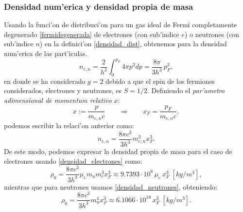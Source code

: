 \subsubsection{Densidad num'erica y densidad propia de masa}
Usando la funci'on de distribuci'on para un gas ideal de Fermi completamente degenerado \eqref{fermidegenerada} de electrones (con sub'indice $e$) o neutrones (con sub'indice $n$)  en la definici'on \eqref{densidad_dist}, obtenemos para la densidad num'erica de las part'iculas.
\begin{equation}
 n_{e,n}=\frac{2}{h^3}\int_0^{p_F}4\pi p^2 dp=\frac{8\pi}{3h^3}\,p_F^3,
\end{equation}
en donde se ha considerado $g=2$ debido a que el spin de los fermiones considerados, electrones y neutrones, es $S=1/2$. Definiendo el \textit{par'ametro adimensional de momentum relativo} $x$:
\begin{equation}\label{xrelativo}
 x:=\frac{p}{m_{e,n}c}\qquad\Rightarrow\qquad x_F=\frac{p_F}{m_{e,n} c},
\end{equation}
podemos escribir la relaci'on anterior como:
\begin{equation}\label{densidadfermi1}
 n_{e,n}=\frac{8\pi c^3}{3 h^3}m_{e,n}^3x_F^3.
\end{equation}
De este modo, podemos expresar la densidad propia de masa para el caso de electrones usando \eqref{densidad_electrones} como:
\begin{equation}\label{densidad_electrones-fermi}
\boxed{ \rho_0= \frac{8\pi c^3}{3 h^3}\mu_em_u m_e^3x_F^3\approx9.7393\cdot10^8\,\mu_e\, x_F^3\;[kg/m^3],}
\end{equation}
mientras que para neutrones usamos \eqref{densidad_neutrones}, obteniendo:
\begin{equation}\label{densidad_neutrones-fermi}
\boxed{ \rho_0= \frac{8\pi c^3}{3 h^3} m_n^4x_F^3\approx6.1066\cdot10^{18}\,x_F^3\;[kg/m^3].}
\end{equation}

